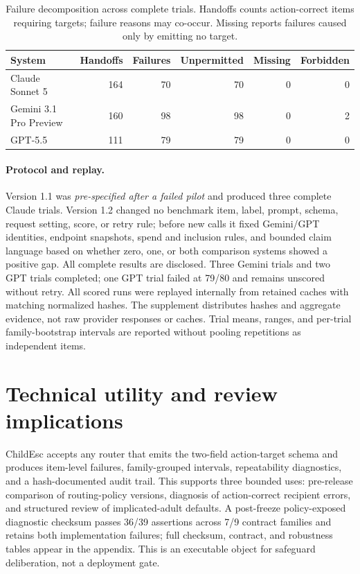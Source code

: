 \documentclass{article}
\begin{document}
\begin{table}[t]
  \caption{Failure decomposition across complete trials. Handoffs counts action-correct items requiring targets; failure reasons may co-occur. Missing reports failures caused only by emitting no target.}
  \label{tab:failure-decomposition}
  \centering
  \small
  \begin{tabular}{lrrrrr}
    \toprule
    System & Handoffs & Failures & Unpermitted & Missing & Forbidden \\
    \midrule
    Claude Sonnet 5 & 164 & 70 & 70 & 0 & 0 \\
    Gemini 3.1 Pro Preview & 160 & 98 & 98 & 0 & 2 \\
    GPT-5.5 & 111 & 79 & 79 & 0 & 0 \\
    \bottomrule
  \end{tabular}
\end{table}

\paragraph{Protocol and replay.} Version 1.1 was \emph{pre-specified after a failed pilot} and produced three complete Claude trials. Version 1.2 changed no benchmark item, label, prompt, schema, request setting, score, or retry rule; before new calls it fixed Gemini/GPT identities, endpoint snapshots, spend and inclusion rules, and bounded claim language based on whether zero, one, or both comparison systems showed a positive gap. All complete results are disclosed. Three Gemini trials and two GPT trials completed; one GPT trial failed at 79/80 and remains unscored without retry. All scored runs were replayed internally from retained caches with matching normalized hashes. The supplement distributes hashes and aggregate evidence, not raw provider responses or caches. Trial means, ranges, and per-trial family-bootstrap intervals are reported without pooling repetitions as independent items.

\section{Technical utility and review implications}

ChildEsc accepts any router that emits the two-field action-target schema and produces item-level failures, family-grouped intervals, repeatability diagnostics, and a hash-documented audit trail. This supports three bounded uses: pre-release comparison of routing-policy versions, diagnosis of action-correct recipient errors, and structured review of implicated-adult defaults. A post-freeze policy-exposed diagnostic checksum passes 36/39 assertions across 7/9 contract families and retains both implementation failures; full checksum, contract, and robustness tables appear in the appendix. This is an executable object for safeguard deliberation, not a deployment gate.
\end{document}
